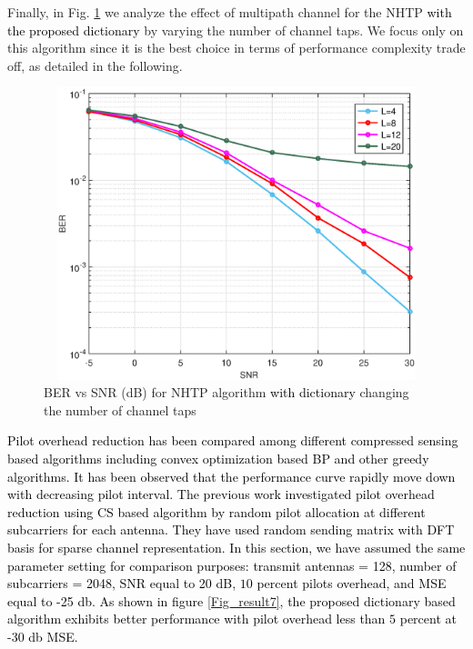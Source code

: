 Finally, in Fig. \ref{Fig_result3} we analyze the effect of multipath channel for the NHTP \textcolor{black}{with the proposed dictionary} by varying the number of channel taps. We focus only on this algorithm since it is the best choice in terms of performance complexity trade off, as detailed in the following.

\begin{figure}
	\centering
	\includegraphics[width=120mm,height=85mm]{figures/figchap4/htp_L_1.eps}
	\caption{BER vs SNR (dB) for NHTP algorithm \textcolor{black}{with dictionary} changing the number of channel taps}	
	\label{Fig_result3}
\end{figure}
\textcolor{black}{
		Pilot overhead reduction has been compared among different compressed sensing based algorithms including convex optimization based BP and other greedy algorithms. It has been observed that the performance curve rapidly move down with decreasing pilot interval. The previous work \cite{pilot15} investigated pilot overhead reduction using CS based algorithm by random pilot allocation at different subcarriers for each antenna. They have used random sending matrix with DFT basis for sparse channel representation. In this section, we have assumed the same parameter setting for comparison purposes: transmit antennas = 128, number of subcarriers = 2048, SNR equal to 20 dB, $10$ percent pilots overhead, and MSE equal to -25 db. As shown in figure \ref{Fig_result7}, the proposed dictionary based algorithm exhibits better performance with pilot overhead less than $5$ percent at -30 db MSE.}
